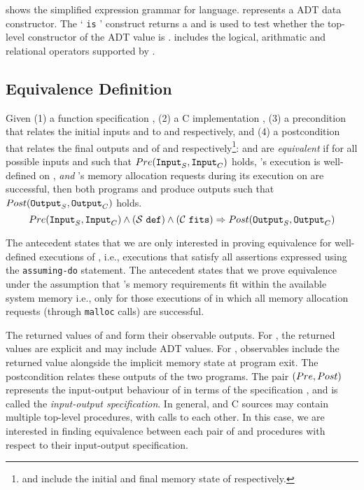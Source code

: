 

 shows the simplified expression grammar for \SpecL{} language.
 represents a ADT data constructor.
The ` {\tt is} ' construct returns a  and is used to test whether the top-level constructor
of the ADT value  is .
 includes the logical, arithmatic and relational operators supported by \SpecL{}.

\subsection{Equivalence Definition}
\label{sec:eqdef}
Given (1) a \SpecL{} function specification \sprog{}, (2) a C implementation \cprog{},
(3) a precondition \pre{} that relates the initial inputs  and  to
\sprog{} and \cprog{} respectively, and (4) a postcondition \post{} that relates the final outputs
 and  of \sprog{} and \cprog{} respectively\footnote{ and 
include the initial and final memory state of \cprog{} respectively.}:
\sprog{} and \cprog{} are {\em equivalent} if for all possible inputs  and  such that
${Pre}{}({\tt Input}_{S},{\tt Input}_{C})$ holds,
\sprog{}'s execution is well-defined on , {\em and}
\cprog{}'s memory allocation requests during its execution on  are successful,
then both programs \sprog{} and \cprog{} produce outputs such that ${Post}{}({\tt Output}_{S},{\tt Output}_{C})$ holds.
$$
{Pre}{}({\tt Input}_{S},{\tt Input}_{C}) \land {({\ensuremath{\mathcal{S}}}{}\ {\tt def})}{} \land {({\ensuremath{\mathcal{C}}}{}\ {\tt fits})}{} \Rightarrow {\ensuremath{Post}}{}({\tt Output}_{S},{\tt Output}_{C})
$$

The \sdef{} antecedent states that we are only interested in proving equivalence for
well-defined executions of \sprog{}, i.e., executions that satisfy all assertions expressed
using the {\tt assuming-do} statement.
The \cfits{} antecedent states that we prove equivalence under the assumption that \cprog{}'s memory
requirements fit within the available system memory i.e., only for those executions of \cprog{}
in which all memory allocation requests (through {\tt malloc} calls) are successful.

The returned values of \sprog{} and \cprog{} form their observable outputs.
For \sprog{}, the returned values are explicit and may include ADT values.
For \cprog{}, observables include the returned value alongside the implicit memory state
at program exit.
The postcondition \post{} relates these outputs of the two programs.
The pair $({Pre}{},{Post}{})$ represents the input-output behaviour of \cprog{} in terms of the specification \sprog{},
and is called the {\em input-output specification}.
In general, \SpecL{} and C sources may contain multiple top-level procedures, with calls to each other.
In this case, we are interested in finding equivalence between each pair
of \sprog{} and \cprog{} procedures with respect to their input-output specification.

